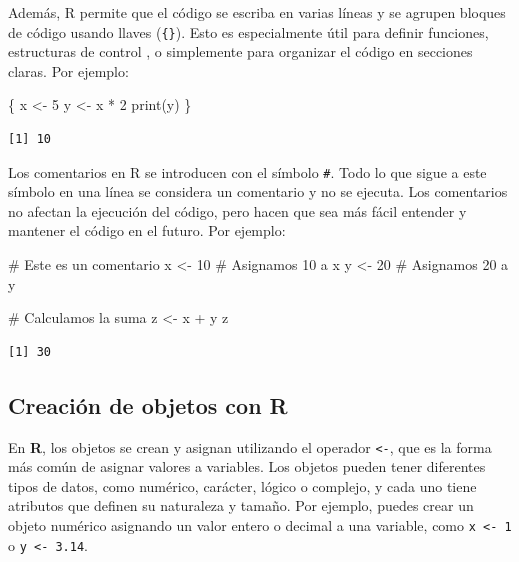\documentclass[
  letterpaper,
]{scrbook}
\newenvironment{Shaded}{\begin{snugshade}}{\end{snugshade}}
\newcommand{\CommentTok}[1]{\textcolor[rgb]{0.37,0.37,0.37}{#1}}
\newcommand{\DecValTok}[1]{\textcolor[rgb]{0.68,0.00,0.00}{#1}}
\newcommand{\FunctionTok}[1]{\textcolor[rgb]{0.28,0.35,0.67}{#1}}
\newcommand{\NormalTok}[1]{\textcolor[rgb]{0.00,0.23,0.31}{#1}}
\newcommand{\OtherTok}[1]{\textcolor[rgb]{0.00,0.23,0.31}{#1}}
\newcommand{\SpecialCharTok}[1]{\textcolor[rgb]{0.37,0.37,0.37}{#1}}
\begin{document}
Además, R permite que el código se escriba en varias líneas y se agrupen
bloques de código usando llaves (\texttt{\{\}}). Esto es especialmente
útil para definir funciones, estructuras de control , o simplemente para
organizar el código en secciones claras. Por ejemplo:

\begin{Shaded}
\begin{Highlighting}[]
\NormalTok{\{}
\NormalTok{  x }\OtherTok{\textless{}{-}} \DecValTok{5}
\NormalTok{  y }\OtherTok{\textless{}{-}}\NormalTok{ x }\SpecialCharTok{*} \DecValTok{2}
  \FunctionTok{print}\NormalTok{(y)}
\NormalTok{\}}
\end{Highlighting}
\end{Shaded}

\begin{verbatim}
[1] 10
\end{verbatim}

Los comentarios en R se introducen con el símbolo \texttt{\#}. Todo lo
que sigue a este símbolo en una línea se considera un comentario y no se
ejecuta. Los comentarios no afectan la ejecución del código, pero hacen
que sea más fácil entender y mantener el código en el futuro. Por
ejemplo:

\begin{Shaded}
\begin{Highlighting}[]
\CommentTok{\# Este es un comentario}
\NormalTok{x }\OtherTok{\textless{}{-}} \DecValTok{10}  \CommentTok{\# Asignamos 10 a x}
\NormalTok{y }\OtherTok{\textless{}{-}} \DecValTok{20}  \CommentTok{\# Asignamos 20 a y}

\CommentTok{\# Calculamos la suma}
\NormalTok{z }\OtherTok{\textless{}{-}}\NormalTok{ x }\SpecialCharTok{+}\NormalTok{ y}
\NormalTok{z}
\end{Highlighting}
\end{Shaded}

\begin{verbatim}
[1] 30
\end{verbatim}

\hypertarget{creaciuxf3n-de-objetos-con-r}{%
\subsection{Creación de objetos con
R}\label{creaciuxf3n-de-objetos-con-r}}

En \textbf{R}, los objetos se crean y asignan utilizando el operador
\texttt{\textless{}-}, que es la forma más común de asignar valores a
variables. Los objetos pueden tener diferentes tipos de datos, como
numérico, carácter, lógico o complejo, y cada uno tiene atributos que
definen su naturaleza y tamaño. Por ejemplo, puedes crear un objeto
numérico asignando un valor entero o decimal a una variable, como
\texttt{x\ \textless{}-\ 1} o \texttt{y\ \textless{}-\ 3.14}.
\end{document}

